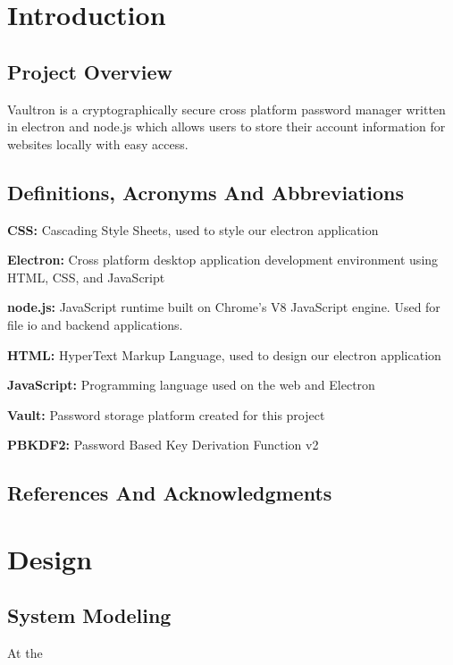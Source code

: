 \documentclass[11pt]{report}
\begin{document}
\clearpage


\tableofcontents{}

\chapter{Introduction}

\section{Project Overview}
Vaultron is a cryptographically secure cross platform password manager
written in electron and node.js which allows users to store their account
information for websites locally with easy access.


\section{Definitions, Acronyms And Abbreviations}
\textbf{CSS:} Cascading Style Sheets, used to style our electron application

\textbf{Electron:} Cross platform desktop application development environment
using HTML, CSS, and JavaScript

\textbf{node.js:} JavaScript runtime built on Chrome's V8 JavaScript engine. Used
for file io and backend applications.

\textbf{HTML:} HyperText Markup Language, used to design our electron application

\textbf{JavaScript:} Programming language used on the web and Electron

\textbf{Vault:} Password storage platform created for this project

\textbf{PBKDF2:} Password Based Key Derivation Function v2


\section{References And Acknowledgments}

    \nocite{*}
    \printbibliography[heading=none]




\chapter{Design}

\section{System Modeling}
At the 
\end{document}
